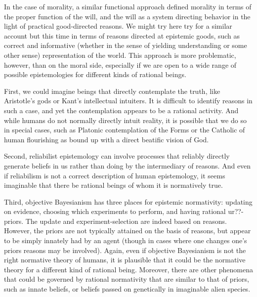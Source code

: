 In the case of morality, a similar functional approach defined morality in terms of the proper function of the will,
and the will as a system directing behavior in the light of practical good-directed reasons. We might try here try for 
a similar account but this time in terms of reasons directed at epistemic goods, such as correct and informative 
(whether in the sense of yielding understanding or some other sense) representation of the world.
This approach is more problematic, however, than on the moral side, especially if we are open to a wide range of 
possible epistemologies for different kinds of rational beings.

First, we could imagine beings that directly contemplate the truth, like Aristotle's gods or Kant's intellectual
intuiters. It is difficult to identify reasons in such a case, and yet the contemplation appears to be a rational
activity. And while humans do not normally directly intuit reality, it is possible that we do so in special cases,
such as Platonic contemplation of the Forms or the Catholic of human flourishing as bound up with a direct beatific
vision of God. 

Second, reliabilist epistemology can involve processes that reliably directly generate beliefs in us rather than 
doing by the intermediary of reasons. And even if reliabilism is not a correct description of human epistemology,
it seems imaginable that there be rational beings of whom it is normatively true.

Third, objective Bayesianism has three places for epistemic normativity: updating on evidence, choosing which 
experiments to perform, and having rational ur??-priors. The update and experiment-selection are indeed based on 
reasons. However, the priors are not typically attained on the basis of reasons, but appear to be simply innately 
had by an agent (though in cases where one changes one's priors reasons may be involved). Again, even if objective 
Bayesianism is not the right normative theory of humans, it is plausible that it could be the normative theory for 
a different kind of rational being. Moreover, there are other phenomena that could be governed by rational 
normativity that are similar to that of priors, such as innate beliefs, or beliefs passed on genetically in 
imaginable alien species. 

